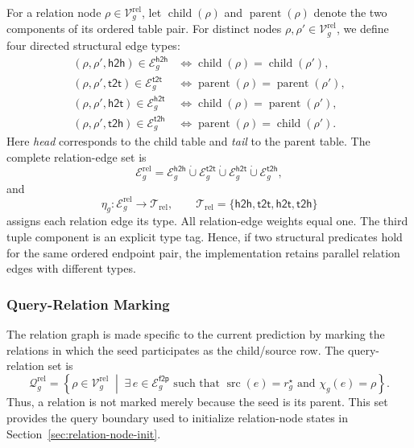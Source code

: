 \documentclass[11pt]{article}
\newcommand{\rel}{\mathrm{rel}}
\DeclareMathOperator{\src}{src}
\begin{document}
For a relation node \(\rho\in\mathcal V_g^{\rel}\), let
\(\operatorname{child}(\rho)\) and \(\operatorname{parent}(\rho)\) denote
the two components of its ordered table pair.  For distinct nodes
\(\rho,\rho'\in\mathcal V_g^{\rel}\), we define four directed structural
edge types:
\begin{align}
    (\rho,\rho',\mathsf{h2h})\in\mathcal E_g^{\mathsf{h2h}}
    &\iff
    \operatorname{child}(\rho)
    =
    \operatorname{child}(\rho'),
    \label{eq:h2h-edge}\\
    (\rho,\rho',\mathsf{t2t})\in\mathcal E_g^{\mathsf{t2t}}
    &\iff
    \operatorname{parent}(\rho)
    =
    \operatorname{parent}(\rho'),
    \label{eq:t2t-edge}\\
    (\rho,\rho',\mathsf{h2t})\in\mathcal E_g^{\mathsf{h2t}}
    &\iff
    \operatorname{child}(\rho)
    =
    \operatorname{parent}(\rho'),
    \label{eq:h2t-edge}\\
    (\rho,\rho',\mathsf{t2h})\in\mathcal E_g^{\mathsf{t2h}}
    &\iff
    \operatorname{parent}(\rho)
    =
    \operatorname{child}(\rho').
    \label{eq:t2h-edge}
\end{align}
Here \emph{head} corresponds to the child table and \emph{tail} to the
parent table.  The complete relation-edge set is
\begin{equation}
    \mathcal E_g^{\rel}
    =
    \mathcal E_g^{\mathsf{h2h}}
    \mathbin{\dot\cup}
    \mathcal E_g^{\mathsf{t2t}}
    \mathbin{\dot\cup}
    \mathcal E_g^{\mathsf{h2t}}
    \mathbin{\dot\cup}
    \mathcal E_g^{\mathsf{t2h}},
    \label{eq:relation-edge-set}
\end{equation}
and
\begin{equation}
    \eta_g:
    \mathcal E_g^{\rel}
    \longrightarrow
    \mathcal T_{\rel},
    \qquad
    \mathcal T_{\rel}
    =
    \{\mathsf{h2h},\mathsf{t2t},\mathsf{h2t},\mathsf{t2h}\}
    \label{eq:relation-edge-type-map}
\end{equation}
assigns each relation edge its type.  All relation-edge weights equal one.
The third tuple component is an explicit type tag.  Hence, if two
structural predicates hold for the same ordered endpoint pair, the
implementation retains parallel relation edges with different types.

\subsubsection{Query-Relation Marking}
\label{sec:query-relation-marking}

The relation graph is made specific to the current prediction by marking
the relations in which the seed participates as the child/source row.  The
query-relation set is
\begin{equation}
    \mathcal Q_g^{\rel}
    =
    \left\{
        \rho\in\mathcal V_g^{\rel}
        \;\middle|\;
        \exists\,e\in\mathcal E_g^{\mathsf{f2p}}
        \text{ such that }
        \src(e)=r_g^\star
        \text{ and }
        \chi_g(e)=\rho
    \right\}.
    \label{eq:query-relation-set}
\end{equation}
Thus, a relation is not marked merely because the seed is its parent.  This
set provides the query boundary used to initialize relation-node states in
Section~\ref{sec:relation-node-init}.
\end{document}
